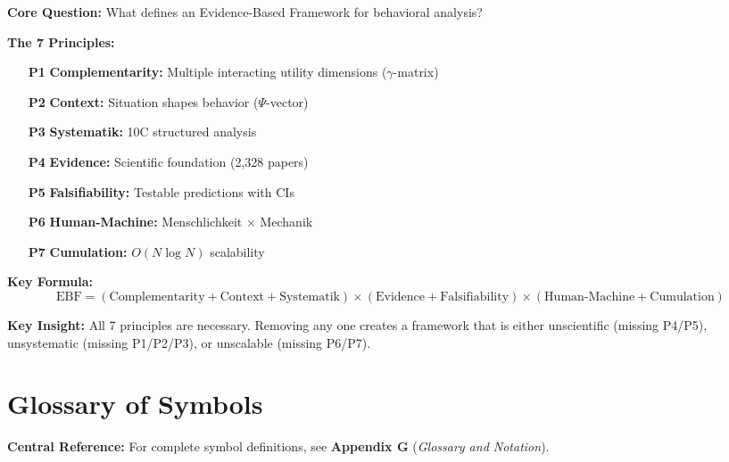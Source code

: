 \begin{tcolorbox}[colback=green!10!white, colframe=green!75!black,
    title=\textbf{Appendix PR: Summary}]

\textbf{Core Question:} What defines an Evidence-Based Framework for behavioral analysis?

\textbf{The 7 Principles:}
\begin{enumerate}
    \item[\textbf{P1}] \textbf{Complementarity:} Multiple interacting utility dimensions ($\gamma$-matrix)
    \item[\textbf{P2}] \textbf{Context:} Situation shapes behavior ($\Psi$-vector)
    \item[\textbf{P3}] \textbf{Systematik:} 10C structured analysis
    \item[\textbf{P4}] \textbf{Evidence:} Scientific foundation (2,328 papers)
    \item[\textbf{P5}] \textbf{Falsifiability:} Testable predictions with CIs
    \item[\textbf{P6}] \textbf{Human-Machine:} Menschlichkeit $\times$ Mechanik
    \item[\textbf{P7}] \textbf{Cumulation:} $O(N \log N)$ scalability
\end{enumerate}

\textbf{Key Formula:}
\begin{equation}
\boxed{\text{EBF} = (\text{Complementarity} + \text{Context} + \text{Systematik}) \times (\text{Evidence} + \text{Falsifiability}) \times (\text{Human-Machine} + \text{Cumulation})}
\end{equation}

\textbf{Key Insight:} All 7 principles are necessary. Removing any one creates a framework that is either unscientific (missing P4/P5), unsystematic (missing P1/P2/P3), or unscalable (missing P6/P7).

\end{tcolorbox}


\section{Glossary of Symbols}
\label{sec:pr-glossary}

\begin{tcolorbox}[colback=blue!5!white, colframe=blue!75!black]
\textbf{Central Reference:} For complete symbol definitions, see
\textbf{Appendix G} (\textit{Glossary and Notation}).
\end{tcolorbox}

